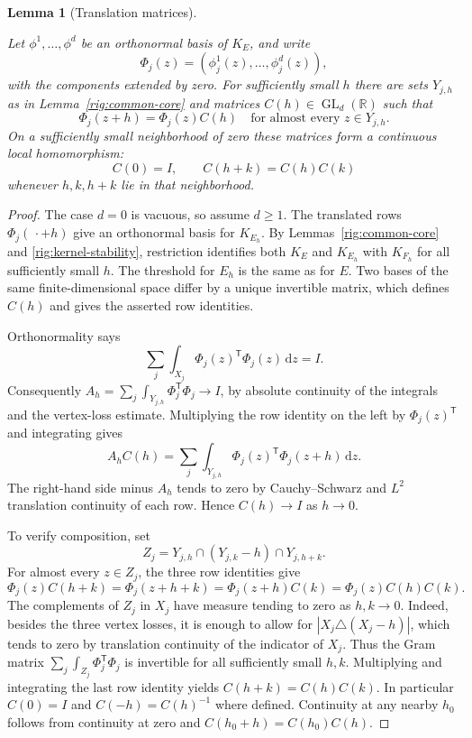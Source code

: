\documentclass[11pt]{amsart}
\newcommand{\R}{\mathbb R}
\newcommand{\dd}{\,\mathrm d}
\newtheorem{lemma}[theorem]{Lemma}
\theoremstyle{definition}
\theoremstyle{remark}
\numberwithin{equation}{section}
\providecommand{\lean}[1]{}
\providecommand{\leanok}{}
\begin{document}
\begin{lemma}[Translation matrices]\label{rig:translation-matrices}
\lean{Auto.rig_translation_matrices}
\leanok
Let $\phi^1,\ldots,\phi^d$ be an orthonormal basis of $K_E$, and write
\[
 \Phi_j(z)=(\phi_j^1(z),\ldots,\phi_j^d(z)),
\]
with the components extended by zero. For sufficiently small $h$ there
are sets $Y_{j,h}$ as in Lemma~\ref{rig:common-core} and matrices
$C(h)\in\operatorname{GL}_d(\R)$ such that
\[
 \Phi_j(z+h)=\Phi_j(z)C(h)
 \quad\text{for almost every }z\in Y_{j,h}.
\]
On a sufficiently small neighborhood of zero these matrices form a
continuous local homomorphism:
\[
 C(0)=I,\qquad C(h+k)=C(h)C(k)
\]
whenever $h,k,h+k$ lie in that neighborhood.
\end{lemma}
\begin{proof}
The case $d=0$ is vacuous, so assume $d\ge1$.
The translated rows $\Phi_j(\,\cdot+h)$ give an orthonormal basis for
$K_{E_h}$. By Lemmas~\ref{rig:common-core} and
\ref{rig:kernel-stability}, restriction identifies both $K_E$ and
$K_{E_h}$ with $K_{F_h}$ for all sufficiently small $h$. The threshold
for $E_h$ is the same as for $E$. Two bases of the same finite-dimensional
space differ by a unique invertible matrix, which defines $C(h)$ and
gives the asserted row identities.

Orthonormality says
\[
 \sum_j\int_{X_j}\Phi_j(z)^{\mathsf T}\Phi_j(z)\dd z=I.
\]
Consequently
$A_h=\sum_j\int_{Y_{j,h}}\Phi_j^{\mathsf T}\Phi_j\to I$, by absolute
continuity of the integrals and the vertex-loss estimate. Multiplying
the row identity on the left by $\Phi_j(z)^{\mathsf T}$ and integrating
gives
\[
 A_hC(h)=\sum_j\int_{Y_{j,h}}
 \Phi_j(z)^{\mathsf T}\Phi_j(z+h)\dd z.
\]
The right-hand side minus $A_h$ tends to zero by Cauchy--Schwarz and
$L^2$ translation continuity of each row. Hence $C(h)\to I$ as $h\to0$.

To verify composition, set
\[
 Z_j=Y_{j,h}\cap(Y_{j,k}-h)\cap Y_{j,h+k}.
\]
For almost every $z\in Z_j$, the three row identities give
\[
 \Phi_j(z)C(h+k)=\Phi_j(z+h+k)
 =\Phi_j(z+h)C(k)=\Phi_j(z)C(h)C(k).
\]
The complements of $Z_j$ in $X_j$ have measure tending to zero as
$h,k\to0$. Indeed, besides the three vertex losses, it is enough to
allow for $|X_j\triangle(X_j-h)|$, which tends to zero by translation
continuity of the indicator of $X_j$.
Thus the Gram matrix $\sum_j\int_{Z_j}\Phi_j^{\mathsf T}\Phi_j$ is
invertible for all sufficiently small $h,k$. Multiplying and integrating
the last row identity yields $C(h+k)=C(h)C(k)$.
In particular $C(0)=I$ and $C(-h)=C(h)^{-1}$ where defined.
Continuity at any nearby $h_0$ follows from continuity at zero and
$C(h_0+h)=C(h_0)C(h)$.
\end{proof}
\end{document}
